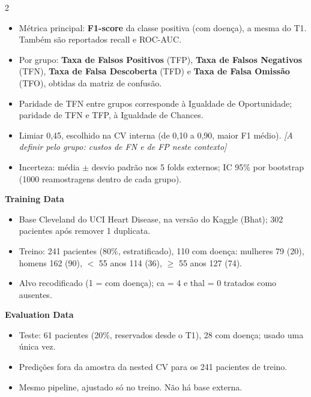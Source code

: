 \documentclass[10pt,a4paper]{article}
\newcommand{\secao}[1]{\par\vspace{5pt}{\normalsize\bfseries #1}\par\vspace{1pt}}
\newcommand{\pendente}[1]{{\color{pendente}\itshape[A definir pelo grupo: #1]}}
\begin{document}
\begin{paracol}{2}
\secao{Metrics}
\begin{itemize}
\item Métrica principal: \textbf{F1-score} da classe positiva (com doença), a mesma do T1. Também são reportados recall e ROC-AUC.
\item Por grupo: \textbf{Taxa de Falsos Positivos} (TFP), \textbf{Taxa de Falsos Negativos} (TFN), \textbf{Taxa de Falsa Descoberta} (TFD) e \textbf{Taxa de Falsa Omissão} (TFO), obtidas da matriz de confusão.
\item Paridade de TFN entre grupos corresponde à Igualdade de Oportunidade; paridade de TFN e TFP, à Igualdade de Chances.
\item Limiar 0,45, escolhido na CV interna (de 0,10 a 0,90, maior F1 médio). \pendente{custos de FN e de FP neste contexto}
\item Incerteza: média $\pm$ desvio padrão nos 5 folds externos; IC 95\% por bootstrap (1000 reamostragens dentro de cada grupo).
\end{itemize}

\vspace{4pt}
\begin{minipage}[t]{0.485\linewidth}
{\normalsize\bfseries Training Data}\par\vspace{1pt}
\begin{itemize}
\item Base Cleveland do UCI Heart Disease, na versão do Kaggle (Bhat); 302 pacientes após remover 1 duplicata.
\item Treino: 241 pacientes (80\%, estratificado), 110 com doença: mulheres 79 (20), homens 162 (90), $<$ 55 anos 114 (36), $\geq$ 55 anos 127 (74).
\item Alvo recodificado (1 = com doença); ca = 4 e thal = 0 tratados como ausentes.
\end{itemize}
\end{minipage}\hfill
\begin{minipage}[t]{0.485\linewidth}
{\normalsize\bfseries Evaluation Data}\par\vspace{1pt}
\begin{itemize}
\item Teste: 61 pacientes (20\%, reservados desde o T1), 28 com doença; usado uma única vez.
\item Predições fora da amostra da nested CV para os 241 pacientes de treino.
\item Mesmo pipeline, ajustado só no treino. Não há base externa.
\end{itemize}
\end{minipage}


\end{paracol}
\end{document}
